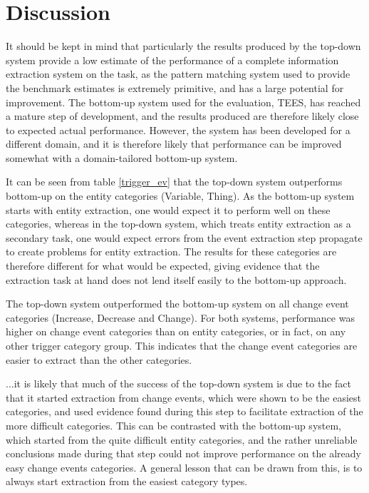 \section{Discussion}

It should be kept in mind that particularly the results produced by the top-down system provide a low estimate of the performance of a complete information extraction system on the task, as the pattern matching system used to provide the benchmark estimates is extremely primitive, and has a large potential for improvement. The bottom-up system used for the evaluation, TEES, has reached a mature step of development, and the results produced are therefore likely close to expected actual performance. However, the system has been developed for a different domain, and it is therefore likely that performance can be improved somewhat with a domain-tailored bottom-up system.


It can be seen from table \ref{trigger_ev} that the top-down system outperforms bottom-up on the entity categories (Variable, Thing). As the bottom-up system starts with entity extraction, one would expect it to perform well on these categories, whereas in the top-down system, which treats entity extraction as a secondary task, one would expect errors from the event extraction step propagate to create problems for entity extraction. The results for these categories are therefore different for what would be expected, giving evidence that the extraction task at hand does not lend itself easily to the bottom-up approach. 

The top-down system outperformed the bottom-up system on all change event categories (Increase, Decrease and Change). For both systems, performance was higher on change event categories than on entity categories, or in fact, on any other trigger category group. This indicates that the change event categories are easier to extract than the other categories. 




...it is likely that much of the success of the top-down system is due to the fact that it started extraction from change events, which were shown to be the easiest categories, and used evidence found during this step to facilitate extraction of the more difficult categories. This can be contrasted with the bottom-up system, which started from the quite difficult entity categories, and the rather unreliable conclusions made during that step could not improve performance on the already easy change events categories. A general lesson that can be drawn from this, is to always start extraction from the easiest category types.